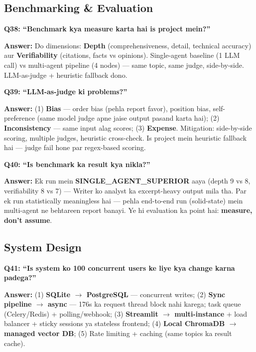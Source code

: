 \subsection{Benchmarking \& Evaluation}

\begin{interviewbox}
\textbf{Q38: ``Benchmark kya measure karta hai is project mein?''}

\textbf{Answer:} Do dimensions: \textbf{Depth} (comprehensiveness, detail, technical accuracy) aur \textbf{Verifiability} (citations, facts vs opinions). Single-agent baseline (1 LLM call) vs multi-agent pipeline (4 nodes) --- same topic, same judge, side-by-side. LLM-as-judge + heuristic fallback dono.
\end{interviewbox}

\begin{interviewbox}
\textbf{Q39: ``LLM-as-judge ki problems?''}

\textbf{Answer:} (1) \textbf{Bias} --- order bias (pehla report favor), position bias, self-preference (same model judge apne jaise output pasand karta hai); (2) \textbf{Inconsistency} --- same input alag scores; (3) \textbf{Expense}. Mitigation: side-by-side scoring, multiple judges, heuristic cross-check. Is project mein heuristic fallback hai --- judge fail hone par regex-based scoring.
\end{interviewbox}

\begin{interviewbox}
\textbf{Q40: ``Is benchmark ka result kya nikla?''}

\textbf{Answer:} Ek run mein \textbf{SINGLE\_AGENT\_SUPERIOR} aaya (depth 9 vs 8, verifiability 8 vs 7) --- Writer ko analyst ka excerpt-heavy output mila tha. Par ek run statistically meaningless hai --- pehla end-to-end run (solid-state) mein multi-agent ne behtareen report banayi. Ye hi evaluation ka point hai: \textbf{measure, don't assume}.
\end{interviewbox}

\subsection{System Design}

\begin{interviewbox}
\textbf{Q41: ``Is system ko 100 concurrent users ke liye kya change karna padega?''}

\textbf{Answer:} (1) \textbf{SQLite $\rightarrow$ PostgreSQL} --- concurrent writes; (2) \textbf{Sync pipeline $\rightarrow$ async} --- 176s ka request thread block nahi karega; task queue (Celery/Redis) + polling/webhook; (3) \textbf{Streamlit $\rightarrow$ multi-instance} + load balancer + sticky sessions ya stateless frontend; (4) \textbf{Local ChromaDB $\rightarrow$ managed vector DB}; (5) Rate limiting + caching (same topics ka result cache).
\end{interviewbox}

